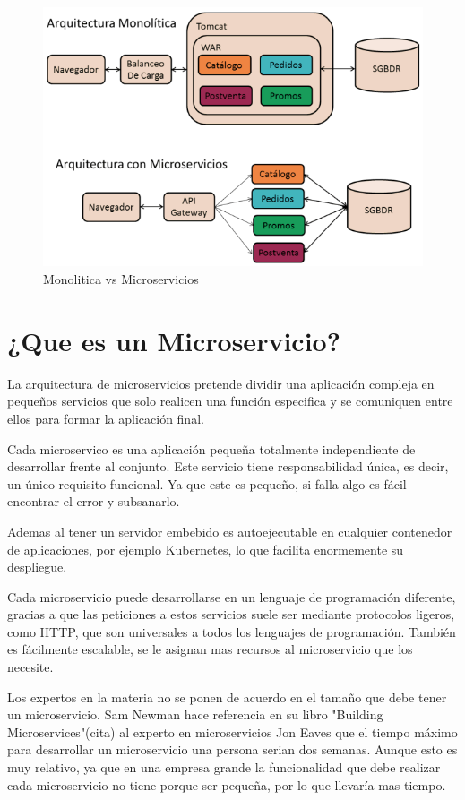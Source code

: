 \documentclass[12pt]{report} %
\begin{document}
	
	\begin{figure}
		\centering
		\includegraphics[width=0.7\linewidth]{imagenes/soavsmicroservicios}
		\caption{Monolitica vs Microservicios}
		\label{fig:soavsmicroservicios}
	\end{figure}













\section{ ¿Que es un Microservicio?}
	La arquitectura de microservicios pretende dividir una aplicación compleja en pequeños servicios que solo realicen una función especifica y se comuniquen entre ellos para formar la aplicación final.
	
	Cada microservico es una aplicación pequeña totalmente independiente de desarrollar frente al conjunto. Este servicio tiene responsabilidad única, es decir, un único requisito funcional. Ya que este es pequeño, si falla algo es fácil encontrar el error y subsanarlo. 
	
	Ademas al tener un servidor embebido es autoejecutable en cualquier contenedor de aplicaciones, por ejemplo Kubernetes, lo que facilita enormemente su despliegue.
	
	Cada microservicio puede desarrollarse en un lenguaje de programación diferente, gracias a que las peticiones a estos servicios suele ser mediante protocolos ligeros, como HTTP, que son universales a todos los lenguajes de programación. También es fácilmente escalable, se le asignan mas recursos al microservicio que los necesite.
	
	Los expertos en la materia no se ponen de acuerdo en el tamaño que debe tener un microservicio. Sam Newman hace referencia en su libro "Building Microservices"(cita) al experto en microservicios Jon Eaves que el tiempo máximo para desarrollar un microservicio una persona serian dos semanas. Aunque esto es muy relativo, ya que en una empresa grande la funcionalidad que debe realizar cada microservicio no tiene porque ser pequeña, por lo que llevaría mas tiempo.
	
\end{document}

